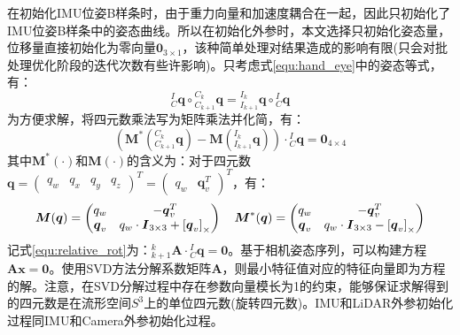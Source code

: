 \label{subsubsec:init_extri_pos}
在初始化IMU位姿B样条时，由于重力向量和加速度耦合在一起，因此只初始化了IMU位姿B样条中的姿态曲线。所以在初始化外参时，本文选择只初始化姿态量，位移量直接初始化为零向量$\boldsymbol{0}_{3\times 1}$，该种简单处理对结果造成的影响有限(只会对批处理优化阶段的迭代次数有些许影响)。只考虑式\ref{equ:hand_eye}中的姿态等式，有：
\begin{equation}
  {{^{I}_{C}}\boldsymbol{q}}\circ{^{C_k}_{C_{k+1}}\boldsymbol{q}}={{^{I_k}_{I_{k+1}}}\boldsymbol{q}}\circ{^{I}_{C}\boldsymbol{q}}
\end{equation}
为方便求解，将四元数乘法写为矩阵乘法并化简，有：
\begin{equation}
  \label{equ:relative_rot}
  \left(\boldsymbol{M}^*\left({^{C_k}_{C_{k+1}}\boldsymbol{q}}\right)-\boldsymbol{M}\left({{^{I_k}_{I_{k+1}}}\boldsymbol{q}}\right)\right)\cdot{^{I}_{C}\boldsymbol{q}}=\boldsymbol{0}_{4\times 4}
\end{equation}
其中$\boldsymbol{M}^*(\cdot)$和$\boldsymbol{M}(\cdot)$的含义为：对于四元数$\boldsymbol{q}=\begin{pmatrix}	q_w&q_x&q_y&q_z	\end{pmatrix}^T=\begin{pmatrix}	q_w&\boldsymbol{q}_v^T	\end{pmatrix}^T$，有：
\begin{equation*}
  \boldsymbol{M}(\boldsymbol{q})=\begin{pmatrix}
    q_w              & -\boldsymbol{q}_v^T                                          \\
    \boldsymbol{q}_v & q_w\cdot\boldsymbol{I}_{3\times 3}+\left[ \boldsymbol{q}_v \right]_\times
  \end{pmatrix}\quad
  \boldsymbol{M}^*(\boldsymbol{q})=\begin{pmatrix}
    q_w              & -\boldsymbol{q}_v^T                                          \\
    \boldsymbol{q}_v & q_w\cdot\boldsymbol{I}_{3\times 3}-\left[ \boldsymbol{q}_v \right]_\times
  \end{pmatrix}
\end{equation*}
记式\ref{equ:relative_rot}为：${^{k}_{k+1}\boldsymbol{A}}\cdot{^{I}_{C}\boldsymbol{q}}=\boldsymbol{0}$。基于相机姿态序列，可以构建方程$\boldsymbol{A}\boldsymbol{x}=\boldsymbol{0}$。使用SVD方法\cite{barfoot2017state}分解系数矩阵$\boldsymbol{A}$，则最小特征值对应的特征向量即为方程的解。注意，在SVD分解过程中存在参数向量模长为1的约束，能够保证求解得到的四元数是在流形空间$S^3$上的单位四元数(旋转四元数)。IMU和LiDAR外参初始化过程同IMU和Camera外参初始化过程。

